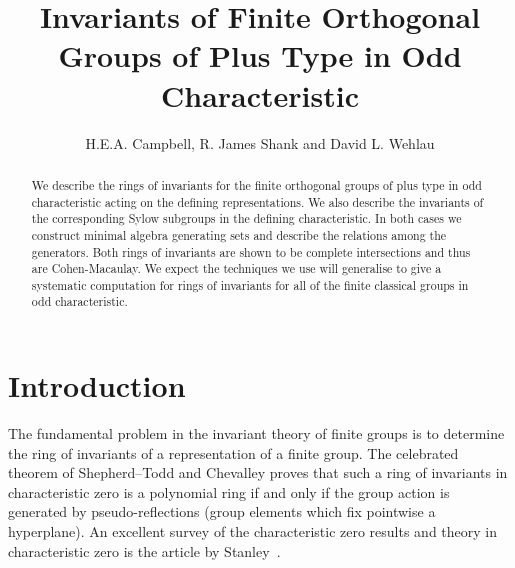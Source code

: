 \documentclass{amsart}
\title[Invariants of Finite Orthogonal Groups]{Invariants of Finite Orthogonal Groups of Plus Type in Odd Characteristic}
\author{H.E.A. Campbell, R. James Shank and David L. Wehlau}
\begin{document}
\begin{abstract}
    We describe the rings of invariants for the finite orthogonal groups of plus type
in odd characteristic acting on the defining representations.  
We also describe the invariants of the corresponding Sylow subgroups in the defining characteristic.  
In both cases we construct minimal algebra generating sets and describe the relations among the generators.  
Both rings of invariants are shown to be complete intersections and thus are 
Cohen-Macaulay.  We expect the techniques we use will generalise to give a systematic 
computation for rings of invariants for all of the finite classical groups in odd characteristic.
\end{abstract}

\maketitle
\setcounter{tocdepth}{1}   
\tableofcontents


\section{Introduction}
The fundamental problem in the invariant theory of finite groups is to determine the ring of invariants 
of a representation of a finite group.  The celebrated theorem of Shepherd--Todd and Chevalley proves that
such a ring of invariants in characteristic zero is a polynomial ring if and only if the group action is 
generated by pseudo-reflections (group elements which fix pointwise a hyperplane). 
An excellent survey of the characteristic zero results and theory in characteristic zero
is the article by Stanley~\cite{stanley:79}.
\end{document}
